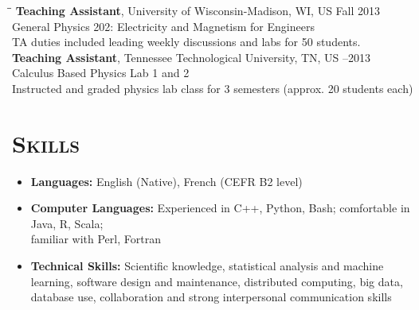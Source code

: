 \documentclass[10pt]{res} %
\begin{document}
\begin{resume}
\begin{tabbing}
\hspace{3.5 in}\= \hspace{1.4in}\= \kill %
\textbf{Teaching Assistant}, University of Wisconsin-Madison, WI, US \>\> Fall 2013 \\
General Physics 202: Electricity and Magnetism for Engineers \\
TA duties included leading weekly discussions and labs for 50 students. \\
\textbf{Teaching Assistant}, Tennessee Technological University, TN, US \>--2013 \\
Calculus Based Physics Lab 1 and 2 \\
Instructed and graded physics lab class for 3 semesters (approx. 20 students each) \\
\end{tabbing}\vspace{-20pt}      %

\section{\textsc{Skills}}
\begin{itemize}
\item \textbf{Languages:} English (Native), French (CEFR B2 level)
\item \textbf{Computer Languages:} Experienced in C++, Python, Bash; comfortable in Java, R, Scala; \\ familiar with Perl, Fortran
\item \textbf{Technical Skills:} Scientific knowledge, statistical analysis and machine learning, software design and maintenance, distributed computing, big data, database use, collaboration and strong interpersonal communication skills
\end{itemize} 

\end{resume}
\end{document}
